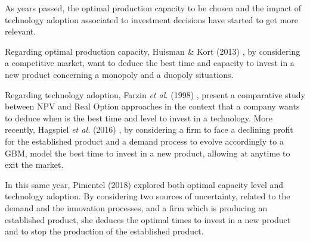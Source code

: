 As years passed, the optimal production capacity to be chosen and the impact of technology adoption associated to investment decisions have started to get more relevant.

Regarding optimal production capacity, Huisman \& Kort (2013) \cite{huis:cap}, by considering a competitive market, want to deduce the best time and capacity to invest in a new product concerning a monopoly and a duopoly situations.

Regarding technology adoption,
Farzin \textit{et al.} (1998) \cite{farzin:cap}, present a comparative study between NPV and Real Option approaches in the context that a company wants to deduce when is the best time and level to invest in a technology.
More recently, Hagspiel \textit{et al.} (2016) \cite{hagspiel:cap}, by considering a firm  to face a declining profit for the established product and a demand process to evolve accordingly to a GBM, model the best time to invest in a new product, allowing at anytime to exit the market. %

In this same year, Pimentel (2018) \cite{rita} explored both optimal capacity level and technology adoption. By considering two sources of uncertainty, related to the demand and the innovation processes,
and a firm which is producing an established product, she deduces the optimal times to invest in a new product and to stop the production of the established product. 







